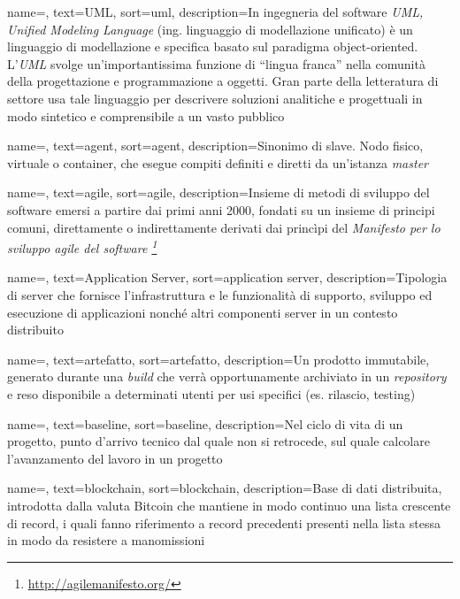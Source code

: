 {
    name=,
    text=UML,
    sort=uml,
    description={In ingegneria del software \emph{UML, Unified Modeling Language} (ing. linguaggio di modellazione unificato) è un linguaggio di modellazione e specifica basato sul paradigma object-oriented. L'\emph{UML} svolge un'importantissima funzione di ``lingua franca'' nella comunità della progettazione e programmazione a oggetti. Gran parte della letteratura di settore usa tale linguaggio per descrivere soluzioni analitiche e progettuali in modo sintetico e comprensibile a un vasto pubblico}
}

{
    name=,
    text=agent,
    sort=agent,
    description={Sinonimo di slave. Nodo fisico, virtuale o container, che esegue compiti definiti e diretti da un'istanza \textit{master}}
}

{
    name=,
    text=agile,
    sort=agile,
    description={Insieme di metodi di sviluppo del software emersi a partire dai primi anni 2000, fondati su un insieme di principi comuni, direttamente o indirettamente derivati dai princìpi del \textit{Manifesto per lo sviluppo agile del software  \footnote{\url{http://agilemanifesto.org/}}}}
}

{
    name=,
    text=Application Server,
    sort=application server,
    description={Tipologia di server che fornisce l'infrastruttura e le funzionalità di supporto, sviluppo ed esecuzione di applicazioni nonché altri componenti server in un contesto distribuito}
}

{
    name=,
    text=artefatto,
    sort=artefatto,
    description={Un prodotto immutabile, generato durante una \textit{build} che verrà opportunamente archiviato in un \textit{repository} e reso disponibile a determinati utenti per usi specifici (es. rilascio, testing)}
}

{
    name=,
    text=baseline,
    sort=baseline,
    description={Nel ciclo di vita di un progetto, punto d'arrivo tecnico dal quale non si retrocede, sul quale calcolare l'avanzamento del lavoro in un progetto}
}

{
    name=,
    text=blockchain,
    sort=blockchain,
    description={Base di dati distribuita, introdotta dalla valuta Bitcoin che mantiene in modo continuo una lista crescente di record, i quali fanno riferimento a record precedenti presenti nella lista stessa in modo da resistere a manomissioni}
}

